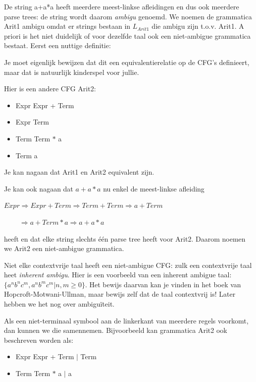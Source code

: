De string a+a*a heeft meerdere meest-linkse afleidingen en dus ook
meerdere parse trees: de string wordt daarom {\em ambigu} genoemd. We
noemen de grammatica Arit1 ambigu omdat er strings bestaan in
$L_{Arit1}$ die ambigu zijn t.o.v. Arit1. A priori is het niet duidelijk
of voor dezelfde taal ook een niet-ambigue grammatica bestaat. Eerst
een nuttige definitie:



Je moet eigenlijk bewijzen dat dit een equivalentierelatie op de CFG's
definieert, maar dat is natuurlijk kinderspel voor jullie.




Hier is een andere CFG Arit2\label{arit2label}:

\begin{itemize}
\item Expr \rpijl Expr + Term
\item Expr \rpijl Term
\item Term \rpijl Term $*$ a
\item Term \rpijl a
\end{itemize}

Je kan nagaan dat Arit1 en Arit2 equivalent zijn.


Je kan ook nagaan dat $a+a*a$ nu enkel de meest-linkse afleiding 


$Expr \Rightarrow Expr + Term \Rightarrow Term + Term \Rightarrow a + Term$

$~~~~~~~~~~\Rightarrow a + Term * a \Rightarrow a + a * a$


heeft en dat elke string slechts \'{e}\'{e}n parse tree heeft voor Arit2.
Daarom noemen we Arit2 een niet-ambigue grammatica.


Niet elke contextvrije taal heeft een niet-ambigue CFG: zulk een
contextvrije taal heet {\em inherent ambigu}. Hier is een voorbeeld van
een inherent ambigue taal: $\{a^nb^nc^m,  a^nb^mc^m| n,m \geq 0\}$.
Het bewijs daarvan kan je vinden in het boek van
Hopcroft-Motwani-Ullman, maar bewijs zelf dat de taal contextvrij is!
Later hebben we het nog over ambigu\"{i}teit.


Als een niet-terminaal symbool aan de linkerkant van meerdere regels
voorkomt, dan kunnen we die samennemen. Bijvoorbeeld kan grammatica
Arit2 ook beschreven worden als:
\begin{itemize}
\item Expr \rpijl Expr + Term $|$ Term
\item Term \rpijl Term $*$ a $|$ a
\end{itemize}



